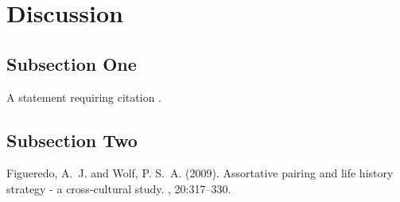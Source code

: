 \documentclass[twoside,twocolumn]{article}
\begin{document}
\section{Discussion}

\subsection{Subsection One}

A statement requiring citation \cite{Figueredo:2009dg}.
\blindtext %

\subsection{Subsection Two}

\blindtext %


\begin{thebibliography}{99} %

Figueredo, A.~J. and Wolf, P. S.~A. (2009).
\newblock Assortative pairing and life history strategy - a cross-cultural
  study.
, 20:317--330.
 
\end{thebibliography}

\end{document}

